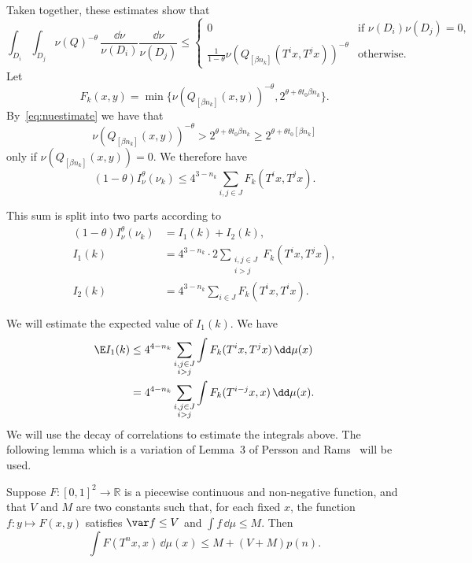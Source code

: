 Taken together, these estimates show that
\[
\int_{D_i} \int_{D_j} \nu (Q)^{-\theta} \, \frac{\dd \nu}{\nu (D_i)} \frac{\dd \nu}{\nu (D_j)} \leq
\left\{
\begin{array}{ll} 0 & \text{if } \nu (D_i) \nu (D_j) = 0,
\\ \frac{1}{1-\theta} \nu (Q_{[\beta n_k]} (T^i x, T^j x))^{-\theta} & \text{otherwise}.
\end{array} \right.
\]
Let
\[
F_k (x,y) = \min\{\nu (Q_{[\beta n_k]} (x, y))^{-\theta}, 2^{\theta + \theta t_0 \beta n_k} \}.
\]
By~\eqref{eq:nuestimate} we have that
\[
\nu (Q_{[\beta n_k]} (x, y))^{-\theta} > 2^{\theta + \theta t_0 \beta n_k} \geq 2^{\theta + \theta t_0 [\beta n_k]}
\]
only if $\nu (Q_{[\beta n_k]} (x, y)) = 0$. We therefore have
\[
(1- \theta) I_\nu^\theta (\nu_k) \leq 4^{3-n_k} \sum_{i,j \in J} F_k (T^i x, T^j x).
\]

This sum is split into two parts according to
\begin{align*}
(1 - \theta) I_\nu^\theta (\nu_k) &= I_1 (k) + I_2 (k), \\ I_1 (k) &= 4^{3 - n_k} \cdot 2 \sum_{\substack{i,j \in J \\i>j}} F_k (T^i x, T^j x),
\\ I_2 (k) &= 4^{3 - n_k} \sum_{i \in J} F_k (T^i x, T^i x).
\end{align*}

We will estimate the expected value of $I_1 (k)$. We have
\begin{align*}
\E I_1 (k) & \leq 4^{4-n_k} \sum_{\substack{i,j \in J \\i>j}} \int F_k (T^i x, T^j x) \, \dd \mu (x) \\ &= 4^{4-n_k}
\sum_{\substack{i,j \in J \\ i>j}} \int F_k (T^{i-j} x, x) \,
\dd \mu (x).
\end{align*}
We will use the decay of correlations to estimate the integrals above. The following lemma which is a variation of Lemma~3 of Persson and Rams~\cite{perssonrams} will be used.

\begin{lemm}\label{lem:perssonrams}
Suppose $F \colon [0,1]^2 \to \mathbb{R}$ is a piecewise continuous and non-negative function, and that $V$ and $M$ are two constants such that, for each fixed $x$, the function $f \colon y \mapsto F(x,y)$ satisfies $\var f \leq V$ and $\int f \, \dd\mu \leq M$. Then
\[
\int F(T^n x, x) \, \dd\mu (x) \leq M + (V + M) p (n).
\]
\end{lemm}

